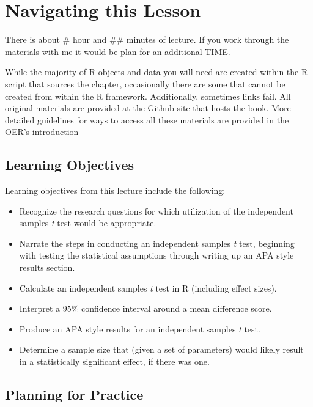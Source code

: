 \documentclass[
  11pt,
]{book}
\providecommand{\tightlist}{%
  \setlength{\itemsep}{0pt}\setlength{\parskip}{0pt}}
\begin{document}
\hypertarget{navigating-this-lesson-3}{%
\section{Navigating this Lesson}\label{navigating-this-lesson-3}}

There is about \# hour and \#\# minutes of lecture. If you work through the materials with me it would be plan for an additional TIME.

While the majority of R objects and data you will need are created within the R script that sources the chapter, occasionally there are some that cannot be created from within the R framework. Additionally, sometimes links fail. All original materials are provided at the \href{https://github.com/lhbikos/ReCenterPsychStats}{Github site} that hosts the book. More detailed guidelines for ways to access all these materials are provided in the OER's \protect\hyperlink{ReCintro}{introduction}

\hypertarget{learning-objectives-3}{%
\subsection{Learning Objectives}\label{learning-objectives-3}}

Learning objectives from this lecture include the following:

\begin{itemize}
\tightlist
\item
  Recognize the research questions for which utilization of the independent samples \emph{t} test would be appropriate.
\item
  Narrate the steps in conducting an independent samples \emph{t} test, beginning with testing the statistical assumptions through writing up an APA style results section.
\item
  Calculate an independent samples \emph{t} test in R (including effect sizes).
\item
  Interpret a 95\% confidence interval around a mean difference score.
\item
  Produce an APA style results for an independent samples \emph{t} test.
\item
  Determine a sample size that (given a set of parameters) would likely result in a statistically significant effect, if there was one.
\end{itemize}

\hypertarget{planning-for-practice-2}{%
\subsection{Planning for Practice}\label{planning-for-practice-2}}
\end{document}
